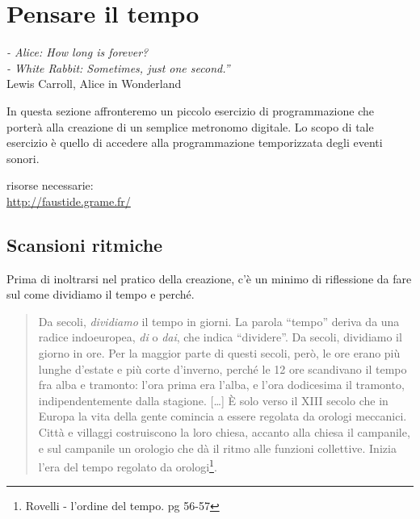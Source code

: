 
\chapter{Pensare il tempo}

\begin{flushright}
\textit{- Alice: How long is forever?\\
- White Rabbit: Sometimes, just one second.”}\\
Lewis Carroll, Alice in Wonderland
\end{flushright}

In questa sezione affronteremo un piccolo esercizio di programmazione che porterà
alla creazione di un semplice metronomo digitale. Lo scopo di tale esercizio è
quello di accedere alla programmazione temporizzata degli eventi sonori.

risorse necessarie:\\
\url{http://faustide.grame.fr/}

\startcontents[chapters]

\section{Scansioni ritmiche}

Prima di inoltrarsi nel pratico della creazione, c'è un minimo di riflessione da
fare sul come dividiamo il tempo e perché.

\begin{quote}
Da secoli, \emph{dividiamo} il tempo in giorni. La parola “tempo” deriva da una
radice indoeuropea, \emph{di} o \emph{dai}, che indica “dividere”. Da secoli,
dividiamo il giorno in ore. Per la maggior parte di questi secoli, però, le ore
erano più lunghe d'estate e più corte d'inverno, perché le 12 ore scandivano il
tempo fra alba e tramonto: l'ora prima era l'alba, e l'ora dodicesima il tramonto,
indipendentemente dalla stagione. [\ldots] È solo verso il XIII secolo che in Europa
la vita della gente comincia a essere regolata da orologi meccanici. Città e
villaggi costruiscono la loro chiesa, accanto alla chiesa il campanile, e sul
campanile un orologio che dà il ritmo alle funzioni collettive. Inizia l'era del
tempo regolato da orologi\footnote{Rovelli - l'ordine del tempo. pg 56-57}.
\end{quote}

